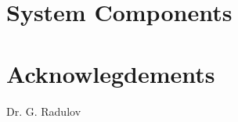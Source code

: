 


\begingroup
\obeylines

\endgroup

\IEEEpeerreviewmaketitle

\IEEEpubidadjcol

\begingroup
\obeylines

\endgroup

\begingroup
\obeylines

\endgroup

\section{System Components}

\begingroup
\obeylines

\endgroup

\begingroup
\obeylines

\endgroup

\begingroup
\obeylines

\endgroup

\begingroup
\obeylines

\endgroup

\begingroup
\obeylines

\endgroup

\begingroup
\obeylines

\endgroup



\section*{Acknowlegdements}
Dr. G. Radulov



